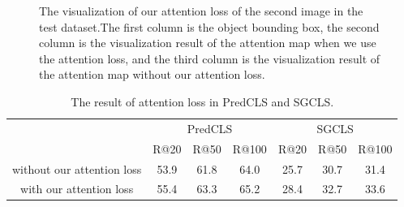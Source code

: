 \begin{figure}[H]
{\begin{minipage}[t]{5cm}
	\end{minipage}}
	
	\caption[The visualization of our attention loss of the second image in the test dataset]{The visualization of our attention loss of the second image in the test dataset.The first column is the object bounding box, the second column is the visualization result of the attention map when we use the attention loss, and the third column is the visualization result of the attention map without our attention loss.}
	\label{fig:bus}
\end{figure}

\begin{table}[!h]
	\centering
	\begin{tabular}{c|ccc|ccc}
		\bottomrule
		\multirow{2}{*}{}           & \multicolumn{3}{c|}{PredCLS} & \multicolumn{3}{c}{SGCLS} \\ \cline{2-7} 
		& R@20    & R@50    & R@100    & R@20   & R@50   & R@100   \\ \hline
		without our attention  loss & 53.9      & 61.8       & 64.0       & 25.7     & 30.7     & 31.4   \\
		with our attention loss     & 55.4       & 63.3       & 65.2        & 28.4      & 32.7      &33.6     \\ \bottomrule
	\end{tabular}

\caption[The result of attention loss in PredCLS and SGCLS]{The result of attention loss in PredCLS and SGCLS.}
\label{tab:result_attetnion_loss}
\end{table}

